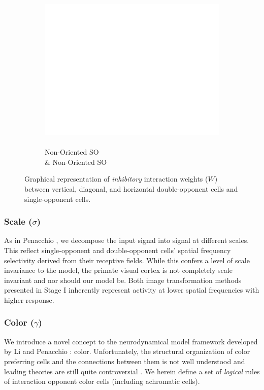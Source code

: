 \documentclass[journal,onecolumn]{IEEEtran}
\begin{document}
\begin{figure}[h]
\begin{subfigure}[b]{0.2\textwidth}
            \captionsetup{justification=centering}
            \includegraphics[width=.85\linewidth]{map-w_blank}
            \caption{\\ Non-Oriented SO \\ \& Non-Oriented SO}
    \end{subfigure}%
    \caption{Graphical representation of \textit{inhibitory} interaction weights ($W$) between vertical, diagonal, and horizontal double-opponent cells and single-opponent cells.}
\end{figure}

\subsubsection*{Scale ($\sigma$)}
As in Penacchio \cite{penacchio:2013}, we decompose the input signal into signal at different scales. This reflect single-opponent and double-opponent cells' spatial frequency selectivity derived from their receptive fields. While this confers a level of scale invariance to the model, the primate visual cortex is not completely scale invariant and nor should our model be. Both image transformation methods presented in Stage I inherently represent activity at lower spatial frequencies with higher response.

\subsubsection*{Color ($\gamma$)}
We introduce a novel concept to the neurodynamical model framework developed by Li \cite{li:1999} and Penacchio \cite{penacchio:2013}: color. Unfortunately, the structural organization of color preferring cells and the connections between them is not well understood and leading theories are still quite controversial \cite{shapley:2011}. We herein define a set of \textit{logical} rules of interaction opponent color cells (including achromatic cells).
\end{document}
